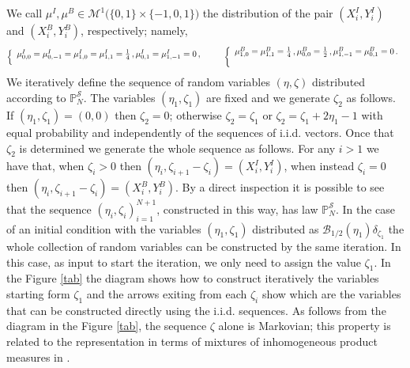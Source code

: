 \documentclass[reqno]{amsart}
\theoremstyle{plain}
\theoremstyle{definition}
\theoremstyle{remark}
\numberwithin{equation}{section}
\numberwithin{theorem}{section}
\def\\{\par\medskip}
\newcommand{\<}{\langle}
\renewcommand{\>}{\rangle}
\begin{document}
	We call $\mu^I,\mu^B\in \mathcal M^1\big(\{0,1\}\times\{-1,0,1\}\big)$ the distribution of the pair $(X^I_i,Y^I_i)$ and $(X_i^B,Y_i^B)$, respectively; namely,
	\[
	\left\{
	\begin{array}{l}
		\mu^I_{0,0}=\mu^I_{0,-1}=\mu^I_{1,0}=\mu^I_{1,1}=\frac 14 \,,\\
		\mu^I_{0,1}=\mu^I_{1,-1}=0\,,
	\end{array}
	\right.
	\qquad
	\left\{
	\begin{array}{l}
		\mu^B_{1,0}=\mu^B_{1,1}=\frac 14 \,,\\
		\mu^B_{0,0}=\frac 12 \,,\\
		\mu^B_{1,-1}=\mu^B_{0,1}=0  \,.
	\end{array}
	\right.
	\]
	We iteratively define the sequence of random variables $(\eta,\zeta)$ distributed according to $\mathbb P_N^{\mathcal S}$. The variables $(\eta_1,\zeta_1)$ are fixed and we generate $\zeta_2$ as follows. If $(\eta_1,\zeta_1)=(0,0)$ then $\zeta_2=0$; otherwise $\zeta_2=\zeta_1$ or $\zeta_2=\zeta_1+2\eta_1-1$ with equal probability and independently of the sequences of i.i.d. vectors. Once that $\zeta_2$ is determined we generate the whole sequence as follows.
	For any $i>1$ we have that, when $\zeta_i>0$ then $(\eta_i,\zeta_{i+1}-\zeta_i)=(X^I_i,Y^I_i)$, when instead $\zeta_i=0$ then 
	$(\eta_i,\zeta_{i+1}-\zeta_i)=(X^B_i,Y^B_i)$. By a direct inspection it is possible to see that the sequence
	$(\eta_i,\zeta_i)_{i=1}^{N+1}$, constructed in this way, has law $\mathbb P_N^{\mathcal S}$.
	In the case of an initial condition with the variables $(\eta_1,\zeta_1)$ distributed as $\mathcal B_{1/2}(\eta_1)\delta_{\zeta_1}$ the whole collection of random variables can be constructed by the same iteration. In this case, as input to start the iteration, we only need to assign the value $\zeta_1$. In the Figure \ref{tab} the diagram shows how to construct iteratively the variables starting form $\zeta_1$ and the arrows exiting from each $\zeta_i$ show which are the variables that can be constructed directly using the i.i.d. sequences. As follows from the diagram in the Figure \ref{tab}, the sequence $\zeta$ alone is Markovian; this property is related to the representation in terms of mixtures of inhomogeneous product measures in \cite{GI1}.
\end{document}
